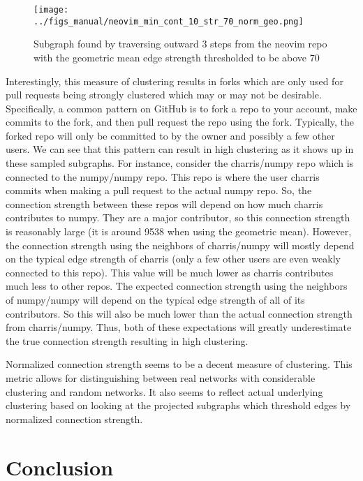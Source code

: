 \documentclass{pset}
\begin{document}
\begin{figure}[ht]
\centering
\texttt{[image: ../figs\_manual/neovim\_min\_cont\_10\_str\_70\_norm\_geo.png]}
\caption{Subgraph found by traversing outward 3 steps from the neovim repo with
    the geometric mean edge strength thresholded to be above 70}\label{fig:neovim geo norm}
\end{figure}

Interestingly, this measure of clustering results in forks which are only used
for pull requests being strongly clustered which may or may not be desirable.
Specifically, a common pattern on GitHub is to fork a repo to your account,
make commits to the fork, and then pull request the repo using the fork.
Typically, the forked repo will only be committed to by the owner and possibly
a few other users. We can see that this pattern can result in high clustering
as it shows up in these sampled subgraphs. For instance, consider the
charris/numpy repo which is connected to the numpy/numpy repo. This repo is
where the user charris commits when making a pull request to the actual numpy
repo. So, the connection strength between these repos will depend on how much
charris contributes to numpy. They are a major contributor, so this connection
strength is reasonably large (it is around 9538 when using the geometric mean).
However, the connection strength using the neighbors of charris/numpy will
mostly depend on the typical edge strength of charris (only a few other users
are even weakly connected to this repo). This value will be much lower as
charris contributes much less to other repos.  The expected connection strength
using the neighbors of numpy/numpy will depend on the typical edge strength of
all of its contributors.  So this will also be much lower than the actual
connection strength from charris/numpy.  Thus, both of these expectations will
greatly underestimate the true connection strength resulting in high
clustering.

Normalized connection strength seems to be a decent measure of clustering.
This metric allows for distinguishing between real networks with considerable
clustering and random networks. It also seems to reflect actual
underlying clustering based on looking at the projected subgraphs
which threshold edges by normalized connection strength.


\section*{Conclusion}
\end{document}
